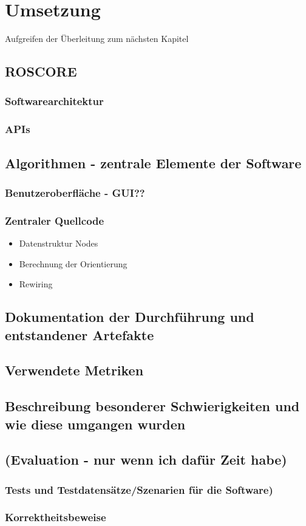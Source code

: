 \section{Umsetzung}
Aufgreifen der Überleitung zum nächsten Kapitel

\subsection{ROSCORE}
\subsubsection{Softwarearchitektur}
\subsubsection{APIs}

\subsection{Algorithmen - zentrale Elemente der Software}
\subsubsection{Benutzeroberfläche - GUI??}
\subsubsection{Zentraler Quellcode}
\begin{itemize}
\item  Datenstruktur Nodes
\item Berechnung der Orientierung
\item Rewiring
\end{itemize}
\subsection{Dokumentation der Durchführung und entstandener Artefakte}
\subsection{Verwendete Metriken}
\subsection{Beschreibung besonderer Schwierigkeiten und wie diese umgangen wurden}
\subsection{(Evaluation - nur wenn ich dafür Zeit habe)}
\subsubsection{Tests und Testdatensätze/Szenarien für die Software)}
\subsubsection{Korrektheitsbeweise}
